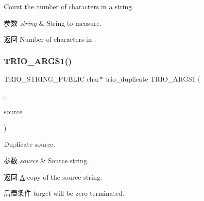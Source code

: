 Count the number of characters in a string.


\begin{DoxyParams}{参数}
{\em string} & String to measure. \\
\hline
\end{DoxyParams}
\begin{DoxyReturn}{返回}
Number of characters in . 
\end{DoxyReturn}
\mbox{\label{group___static_strings_ga8b1decd512168ca86f9e01580681a7be}} 
\subsubsection{\texorpdfstring{T\+R\+I\+O\+\_\+\+A\+R\+G\+S1()}{TRIO\_ARGS1()}\hspace{0.1cm}{\footnotesize\ttfamily [4/7]}}
{\footnotesize\ttfamily T\+R\+I\+O\+\_\+\+S\+T\+R\+I\+N\+G\+\_\+\+P\+U\+B\+L\+IC char$\ast$ trio\+\_\+duplicate T\+R\+I\+O\+\_\+\+A\+R\+G\+S1 (\begin{DoxyParamCaption}\item[{(\hyperlink{structsource}{source})}]{,  }\item[{T\+R\+I\+O\+\_\+\+C\+O\+N\+ST char $\ast$}]{source }\end{DoxyParamCaption})}

Duplicate {\ttfamily source}.


\begin{DoxyParams}{参数}
{\em source} & Source string. \\
\hline
\end{DoxyParams}
\begin{DoxyReturn}{返回}
\hyperlink{struct_a}{A} copy of the {\ttfamily source} string.
\end{DoxyReturn}
\begin{DoxyPostcond}{后置条件}
{\ttfamily target} will be zero terminated. 
\end{DoxyPostcond}
\mbox{\label{group___static_strings_gaa97797190efd0bb9a4b877980ce72a3b}} 

